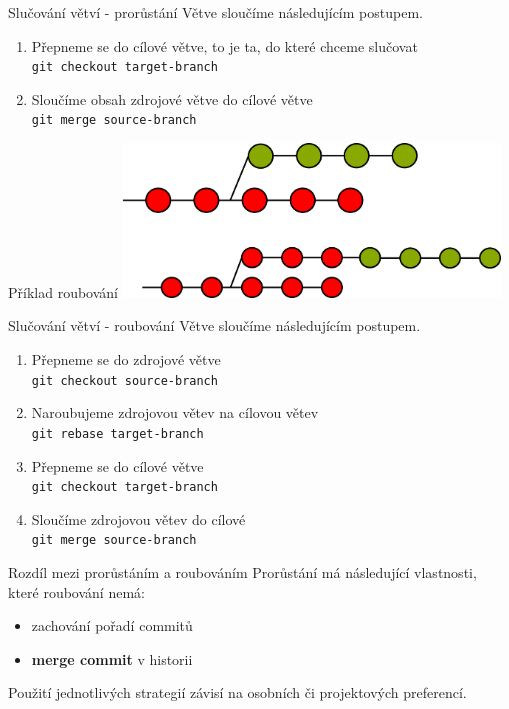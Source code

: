 \documentclass[14pt]{beamer}
\renewcommand{\texttt}[1]{{{\tt\color{blue}#1}}}
\begin{document}
	\begin{frame}{Slučování větví - prorůstání}
	Větve sloučíme následujícím postupem.
	
	\begin{enumerate}
		\item Přepneme se do cílové větve, to je ta, do které chceme slučovat \\
		\texttt{git checkout target-branch}
		\item Sloučíme obsah zdrojové větve do cílové větve \\
		\texttt{git merge source-branch}
	\end{enumerate}
	\end{frame}

	\begin{frame}{Příklad roubování}
	\includegraphics[width=10cm]{images/rebase}
\end{frame}

\begin{frame}{Slučování větví - roubování}
	Větve sloučíme následujícím postupem.
	
	\begin{enumerate}
		\item Přepneme se do zdrojové větve \\
		\texttt{git checkout source-branch}
		\item Naroubujeme zdrojovou větev na cílovou větev \\
		\texttt{git rebase target-branch}
		\item Přepneme se do cílové větve \\
		\texttt{git checkout target-branch}
		\item Sloučíme zdrojovou větev do cílové\\
		\texttt{git merge source-branch}
	\end{enumerate}
\end{frame}

	\begin{frame}{Rozdíl mezi prorůstáním a roubováním}
		Prorůstání má následující vlastnosti, které roubování nemá:
		\begin{itemize}
			\item zachování pořadí commitů
			\item \textbf{merge commit} v historii
		\end{itemize}
	Použití jednotlivých strategií závisí na osobních či projektových preferencí.
	\end{frame}
\end{document}
